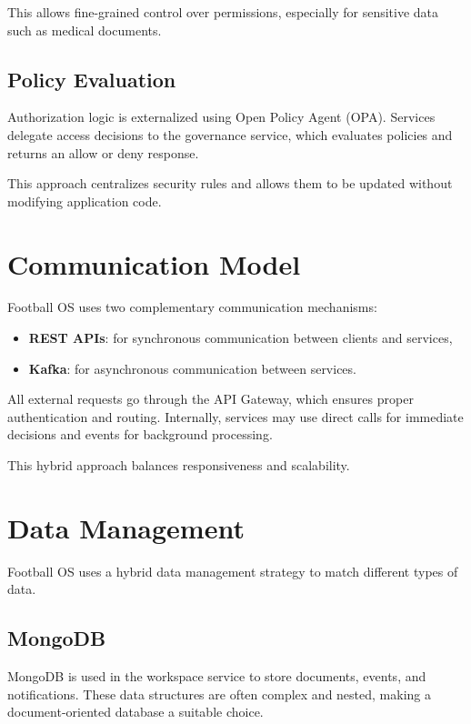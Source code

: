This allows fine-grained control over permissions, especially for
sensitive data such as medical documents.

\subsection{Policy Evaluation}

Authorization logic is externalized using Open Policy Agent (OPA).
Services delegate access decisions to the governance service, which
evaluates policies and returns an allow or deny response.

This approach centralizes security rules and allows them to be updated
without modifying application code.

\section{Communication Model}

Football OS uses two complementary communication mechanisms:

\begin{itemize}
    \item \textbf{REST APIs}: for synchronous communication between clients and services,
    \item \textbf{Kafka}: for asynchronous communication between services.
\end{itemize}

All external requests go through the API Gateway, which ensures proper
authentication and routing. Internally, services may use direct calls
for immediate decisions and events for background processing.

This hybrid approach balances responsiveness and scalability.

\section{Data Management}

Football OS uses a hybrid data management strategy to match different
types of data.

\subsection{MongoDB}

MongoDB is used in the workspace service to store documents, events,
and notifications. These data structures are often complex and nested,
making a document-oriented database a suitable choice.

